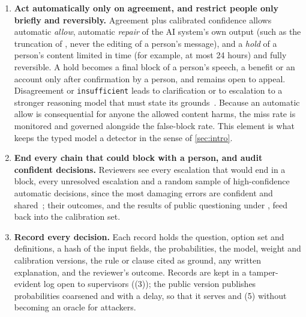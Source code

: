 \begin{enumerate}
  \item \textbf{Act automatically only on agreement, and restrict people only briefly and reversibly.} Agreement plus calibrated confidence allows automatic \emph{allow}, automatic \emph{repair} of the AI system's own output (such as the truncation of , never the editing of a person's message), and a \emph{hold} of a person's content limited in time (for example, at most 24 hours) and fully reversible. A hold becomes a final block of a person's speech, a benefit or an account only after confirmation by a person, and remains open to appeal. Disagreement or \texttt{insufficient} leads to clarification or to escalation to a stronger reasoning model that must state its grounds~\cite{arx26550}. Because an automatic allow is consequential for anyone the allowed content harms, the miss rate is monitored and governed alongside the false-block rate. This element is what keeps the typed model a detector in the sense of \cref{sec:intro}.
  \item \textbf{End every chain that could block with a person, and audit confident decisions.} Reviewers see every escalation that would end in a block, every unresolved escalation and a random sample of high-confidence automatic decisions, since the most damaging errors are confident and shared~\cite{arx29769,arx33401}; their outcomes, and the results of public questioning under , feed back into the calibration set.
  \item \textbf{Record every decision.} Each record holds the question, option set and definitions, a hash of the input fields, the probabilities, the model, weight and calibration versions, the rule or clause cited as ground, any written explanation, and the reviewer's outcome. Records are kept in a tamper-evident log open to supervisors ((3)); the public version publishes probabilities coarsened and with a delay, so that it serves  and (5) without becoming an oracle for attackers.
\end{enumerate}

